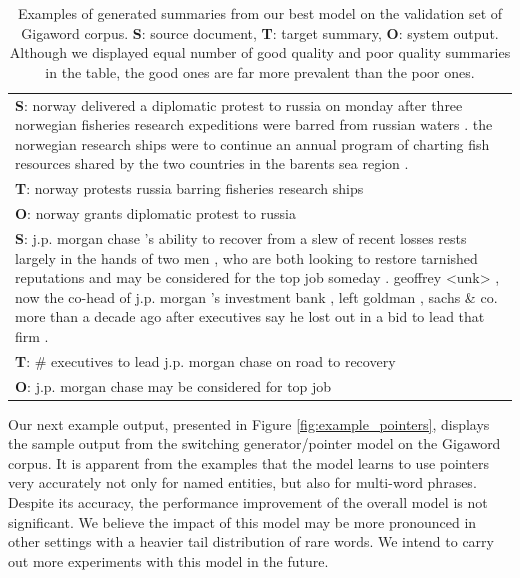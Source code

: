 \begin{table}
\begin{center}
{\begin{tabular}{|p{7.5cm}|}
\hline
{\bf S}: norway delivered a diplomatic protest to russia on monday after three norwegian fisheries research expeditions were barred from russian waters . the norwegian research ships were to continue an annual program of charting fish resources shared by the two countries in the barents sea region .\\
{\bf T}: norway protests russia barring fisheries research ships \\
{\bf O}: norway grants diplomatic protest to russia\\
\hline
{\bf S}: j.p. morgan chase 's ability to recover from a slew of recent losses rests largely in the hands of two men , who are both looking to restore tarnished reputations and may be considered for the top job someday .  geoffrey <unk> , now the co-head of j.p. morgan 's investment bank , left goldman , sachs \& co. more than a decade ago after executives say he lost out in a bid to lead that firm .\\
{\bf T}: \# executives to lead j.p. morgan chase on road to recovery \\
{\bf O}: j.p. morgan chase may be considered for top job \\
\hline
\end{tabular}
}
\end{center}
\caption{\label{fig:example_outputs} {\small Examples of generated summaries from our best model on the validation set of Gigaword corpus. {\bf S}: source document, {\bf T}: target summary, {\bf O}: system output. Although we displayed equal number of good quality and poor quality summaries in the table, the good ones are far more prevalent than the poor ones.}}
\vspace{-2mm}
\end{table}

Our next example output, presented in Figure \ref{fig:example_pointers}, displays the sample output from the switching generator/pointer model on the Gigaword corpus. It is apparent from the examples that the model learns to use pointers very accurately not only for named entities, but also for multi-word phrases. Despite its accuracy, the performance improvement of the overall model is not significant. We believe the impact of this model may be more pronounced in other settings with a heavier tail distribution of rare words. We intend to carry out more experiments with this model in the future.

